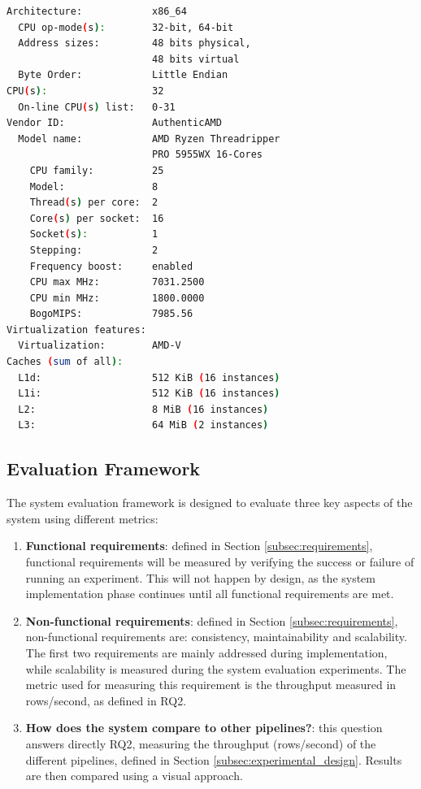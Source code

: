 \begin{lstlisting}[language=bash, caption={[Experimental environment details]Output of a \textit{lscpu} bash command in the experimental environment.}, label={lst:cpu_snurran}, frame=tb]
Architecture:            x86_64
  CPU op-mode(s):        32-bit, 64-bit
  Address sizes:         48 bits physical, 
                         48 bits virtual
  Byte Order:            Little Endian
CPU(s):                  32
  On-line CPU(s) list:   0-31
Vendor ID:               AuthenticAMD
  Model name:            AMD Ryzen Threadripper 
                         PRO 5955WX 16-Cores
    CPU family:          25
    Model:               8
    Thread(s) per core:  2
    Core(s) per socket:  16
    Socket(s):           1
    Stepping:            2
    Frequency boost:     enabled
    CPU max MHz:         7031.2500
    CPU min MHz:         1800.0000
    BogoMIPS:            7985.56
Virtualization features: 
  Virtualization:        AMD-V
Caches (sum of all):     
  L1d:                   512 KiB (16 instances)
  L1i:                   512 KiB (16 instances)
  L2:                    8 MiB (16 instances)
  L3:                    64 MiB (2 instances)
\end{lstlisting}

\subsection{Evaluation Framework}
%

The system evaluation framework is designed to evaluate three key aspects of the system using different metrics:
\begin{enumerate}
    \item \textbf{Functional requirements}: defined in Section \ref{subsec:requirements}, functional requirements will be measured by verifying the success or failure of running an experiment. This will not happen by design, as the system implementation phase continues until all functional requirements are met.
    \item \textbf{Non-functional requirements}: defined in Section \ref{subsec:requirements}, non-functional requirements are: consistency, maintainability and scalability. The first two requirements are mainly addressed during implementation, while scalability is measured during the system evaluation experiments. The metric used for measuring this requirement is the throughput measured in rows/second, as defined in RQ2.
    \item \textbf{How does the system compare to other pipelines?}: this question answers directly RQ2, measuring the throughput (rows/second) of the different pipelines, defined in Section \ref{subsec:experimental_design}. Results are then compared using a visual approach.
\end{enumerate} 

